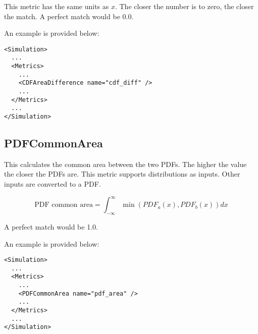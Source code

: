 This metric has the same units as $x$.  The closer the number is
to zero, the closer the match.  A perfect match would be 0.0.

An example is provided below:
\begin{lstlisting}[style=XML]
<Simulation>
  ...
  <Metrics>
    ...
    <CDFAreaDifference name="cdf_diff" />
    ...
  </Metrics>
  ...
</Simulation>
\end{lstlisting}

\subsection{PDFCommonArea}

This calculates the common area between the two PDFs.  The higher the
value the closer the PDFs are.  This metric supports distributions as
inputs.  Other inputs are converted to a PDF.

\begin{equation}
  \text{PDF common area} = \int_{-\infty}^{\infty}{\min(PDF_a(x),PDF_b(x))}dx
\end{equation}

A perfect match would be 1.0.


An example is provided below:
\begin{lstlisting}[style=XML]
<Simulation>
  ...
  <Metrics>
    ...
    <PDFCommonArea name="pdf_area" />
    ...
  </Metrics>
  ...
</Simulation>
\end{lstlisting}
